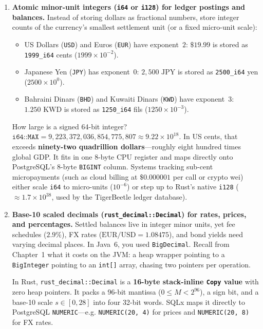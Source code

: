 \begin{enumerate}
  \item \textbf{Atomic minor-unit integers (\texttt{i64} or \texttt{i128}) for ledger postings and balances.} Instead of storing dollars as fractional numbers, store integer counts of the currency's smallest settlement unit (or a fixed micro-unit scale):
    \begin{itemize}
      \item US Dollars (\texttt{USD}) and Euros (\texttt{EUR}) have exponent~$2$: $\$19.99$ is stored as \texttt{1999\_i64} cents ($1999 \times 10^{-2}$).
      \item Japanese Yen (\texttt{JPY}) has exponent~$0$: $2{,}500\text{ JPY}$ is stored as \texttt{2500\_i64} yen ($2500 \times 10^{0}$).
      \item Bahraini Dinars (\texttt{BHD}) and Kuwaiti Dinars (\texttt{KWD}) have exponent~$3$: $1.250\text{ KWD}$ is stored as \texttt{1250\_i64} fils ($1250 \times 10^{-3}$).
    \end{itemize}
    How large is a signed 64-bit integer? $\texttt{i64::MAX} = 9{,}223{,}372{,}036{,}854{,}775{,}807 \approx 9.22 \times 10^{18}$. In US cents, that exceeds \textbf{ninety-two quadrillion dollars}---roughly eight hundred times global GDP. It fits in one 8-byte CPU register and maps directly onto PostgreSQL's 8-byte \texttt{BIGINT} column. Systems tracking sub-cent micropayments (such as cloud billing at $\$0.000001$ per call or crypto wei) either scale \texttt{i64} to micro-units ($10^{-6}$) or step up to Rust's native \texttt{i128} ($\approx 1.7 \times 10^{38}$, used by the TigerBeetle ledger database).

  \item \textbf{Base-10 scaled decimals (\texttt{rust\_decimal::Decimal}) for rates, prices, and percentages.} Settled balances live in integer minor units, yet fee schedules ($2.9\%$), FX rates ($\text{EUR/USD} = 1.08475$), and bond yields need varying decimal places. In Java~6, you used \texttt{BigDecimal}. Recall from Chapter~1 what it costs on the JVM: a heap wrapper pointing to a \texttt{BigInteger} pointing to an \texttt{int[]} array, chasing two pointers per operation.

  In Rust, \texttt{rust\_decimal::Decimal} is a \textbf{16-byte stack-inline \texttt{Copy} value} with zero heap pointers. It packs a 96-bit mantissa ($0 \le M < 2^{96}$), a sign bit, and a base-10 scale $s \in [0, 28]$ into four 32-bit words. SQLx maps it directly to PostgreSQL \texttt{NUMERIC}---e.g. \texttt{NUMERIC(20, 4)} for prices and \texttt{NUMERIC(20, 8)} for FX rates.
\end{enumerate}

